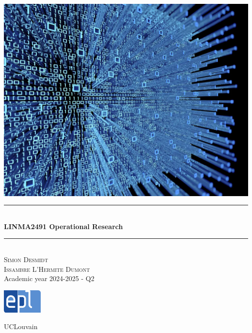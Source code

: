 \documentclass[12pt, openany]{report}
\newcommand{\HRule}{\rule{\linewidth}{0.5mm}}
\theoremstyle{definition}
\begin{document}
\begin{titlepage}
    \begin{sffamily}
    \begin{center}
        \includegraphics[scale=0.25]{img/page_de_garde.png} \\[1cm]
        \HRule \\[0.4cm]
        { \huge \bfseries LINMA2491 Operational Research \\[0.4cm] }
    
        \HRule \\[1.5cm]
        \textsc{\LARGE Simon Desmidt\\ Issambre L'Hermite Dumont}\\[1cm]
        \vfill
        \vspace{2cm}
        {\large Academic year 2024-2025 - Q2}
        \vspace{0.4cm}
         
        \includegraphics[width=0.15\textwidth]{img/epl.png}
        
        UCLouvain\\
    
    \end{center}
    \end{sffamily}
\end{titlepage}

\setcounter{tocdepth}{1}
\tableofcontents
\end{document}
